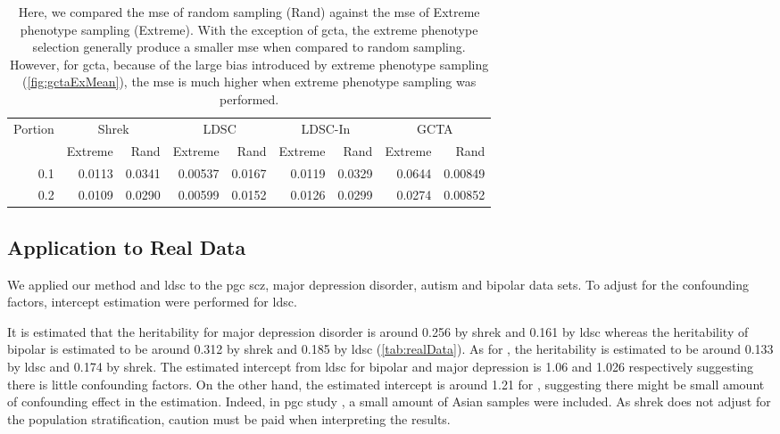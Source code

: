 \documentclass[12pt]{scrbook}
\newcommand*{\glng}{\glsentrylong}
\begin{document}
\begin{table}
	\centering
	\begin{tabular}{rrrrrrrrr}
		\toprule
		\multirow{2}[4]{*}{Portion} & \multicolumn{2}{c}{Shrek} & \multicolumn{2}{c}{LDSC} & \multicolumn{2}{c}{LDSC-In} & \multicolumn{2}{c}{GCTA} \\
		& Extreme & Rand & Extreme & Rand & Extreme & Rand & Extreme & Rand\\
		\midrule
		0.1   & 0.0113 & 0.0341 & 0.00537 & 0.0167 & 0.0119 & 0.0329 & 0.0644 & 0.00849 \\
		0.2   & 0.0109 & 0.0290 & 0.00599 & 0.0152 & 0.0126 & 0.0299 & 0.0274 & 0.00852 \\
		\bottomrule
	\end{tabular}
	\caption[Comparing the MSE of Extreme Phenotype Sampling and Random Sampling]{
		Here, we compared the \gls{mse} of random sampling (Rand) against the \gls{mse} of Extreme phenotype sampling (Extreme). 
		With the exception of \gls{gcta}, the extreme phenotype selection generally produce a smaller \gls{mse} when compared to random sampling. 
		However, for \gls{gcta}, because of the large bias introduced by extreme phenotype sampling (\cref{fig:gctaExMean}), the \gls{mse} is much higher when extreme phenotype sampling was performed.
	}
	\label{tab:ratioEx}
\end{table}


\subsection{Application to Real Data}
We applied our method and \gls{ldsc} to the \gls{pgc} \gls{scz}, major depression disorder, autism and bipolar data sets.
To adjust for the confounding factors, intercept estimation were performed for \gls{ldsc}. 

It is estimated that the heritability for major depression disorder is around 0.256 by \gls{shrek} and 0.161 by \gls{ldsc} whereas the heritability of bipolar is estimated to be around 0.312 by \gls{shrek} and 0.185 by \gls{ldsc} (\cref{tab:realData}).
As for \glng{scz}, the heritability is estimated to be around 0.133 by \gls{ldsc} and 0.174 by \gls{shrek}.
The estimated intercept from \gls{ldsc} for bipolar and major depression is 1.06 and 1.026 respectively suggesting there is little confounding factors. 
On the other hand, the estimated intercept is around 1.21 for \glng{scz}, suggesting there might be small amount of confounding effect in the estimation.
Indeed, in \gls{pgc} \glng{scz} study \citep{Ripke2014}, a small amount of Asian samples were included.
As \gls{shrek} does not adjust for the population stratification, caution must be paid when interpreting the results.
\end{document}
